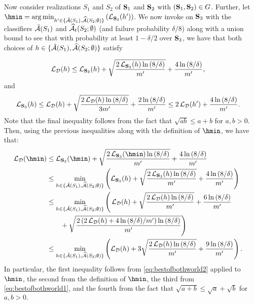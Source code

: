 Now consider realizations $ S_{1} $ and $ S_{2} $  of $\mathbf{S}_1$ and $\mathbf{S}_2$ with $(\mathbf{S}_1,\mathbf{S}_2) \in G$. Further, let $ \hmin=\argmin_{h'\in\{   \tilde{\cA}(S_{1}),\widehat{\cA}(S_{2};\emptyset)\}}\left(\ls_{\rS_{3}}(h')\right)$. 
We now invoke  on $ \mathbf{S}_{3}$ with the classifiers $ \tilde{\mathcal{A}}(S_{1})$ and $\widehat{\mathcal{A}}_{t}(S_{2};\emptyset)$ (and failure probability $\delta/8$) along with a union bound to see that with probability at least  $ 1-\delta/2 $  over $ \mathbf{S}_{3} $, we have that both choices of  $ h\in\{   \tilde{\mathcal{A}}(S_{1}),\widehat{\mathcal{A}}(S_{2};\emptyset)\}$ satisfy 

\begin{align}\label{eq:bestofbothworld2}
    \operatorname{\mathcal{L}}_{\mathcal{D}}(h)\leq \operatorname{\mathcal{L}}_{\mathbf{S}_{3}}(h) +\sqrt{\frac{2\operatorname{\mathcal{L}}_{\mathbf{S}_{3}}(h)\ln{(8/\delta )}}{m'}}+\frac{4\ln{(8/\delta )}}{m'},
    \end{align}
and
\begin{align}\label{eq:bestofbothworld1}
\operatorname{\mathcal{L}}_{\mathbf{S}_{3}}(h)\leq \operatorname{\mathcal{L}}_{\mathcal{D}}(h) +\sqrt{\frac{2\operatorname{\mathcal{L}}_{\mathcal{D}}(h)\ln{(8/\delta )}}{3m'}}+\frac{2\ln{(8/\delta )}}{m'}\leq 2\operatorname{\mathcal{L}}_{\mathcal{D}}(h')+\frac{4\ln{\left(8/\delta \right)}}{m'}. 
\end{align}
Note that the final inequality follows from the fact that $ \sqrt{ab}\leq a+b $ for $ a,b>0.$ 
Then, using the previous inequalities along with the definition of $\hmin$, we have that: 
\begin{align}\label{eq:bestofbothworld4}
 \ls_{\cD}(\hmin) &\leq  \ls_{\rS_{3}}(\hmin) +\sqrt{\frac{2\ls_{\rS_{3}}(\hmin)\ln{(8/\delta )}}{m'}}+\frac{4\ln{(8/\delta )}}{m'}
 \\
&\leq \min_{h\in\{   \tilde{\cA}(S_{1}),\widehat{\cA}(S_{2};\emptyset)\}}\left(\ls_{\rS_{3}}(h) +\sqrt{\frac{2\ls_{\rS_{3}}(h)\ln{(8/\delta )}}{m'}}+\frac{4\ln{(8/\delta )}}{m'}\right)
 \\
& \leq \min_{h\in\{   \tilde{\cA}(S_{1}),\widehat{\cA}(S_{2};\emptyset)\}}\Bigg(\ls_{\cD}(h) +\sqrt{\frac{2\ls_{\cD}(h)\ln{(8/\delta )}}{m'}}+\frac{6\ln{(8/\delta )}}{m'}  \nonumber \\
& \qquad + \sqrt{\frac{2\left( 2\ls_{\cD}(h)+4\ln{\left(8/\delta \right)}/m' \right)\ln{\left(8/\delta \right)}}{m'}}\Bigg)
 \\
& \leq  \min_{h\in\{   \tilde{\cA}(S_{1}),\widehat{\cA}(S_{2};\emptyset)\}}\left(\ls_{\cD}(h) + 3 \sqrt{\frac{2\ls_{\cD}(h)\ln{(8/\delta )}}{m'}}+\frac{9\ln{(8/\delta )}}{m'}\right).
\end{align}
In particular, the first inequality follows from \cref{eq:bestofbothworld2} applied to $\hmin$, the second from the definition of $\hmin$, the third from \cref{eq:bestofbothworld1}, and the fourth from the fact that $ \sqrt{a+b}\leq \sqrt{a}+\sqrt{b}$ for $ a,b>0.$ 
